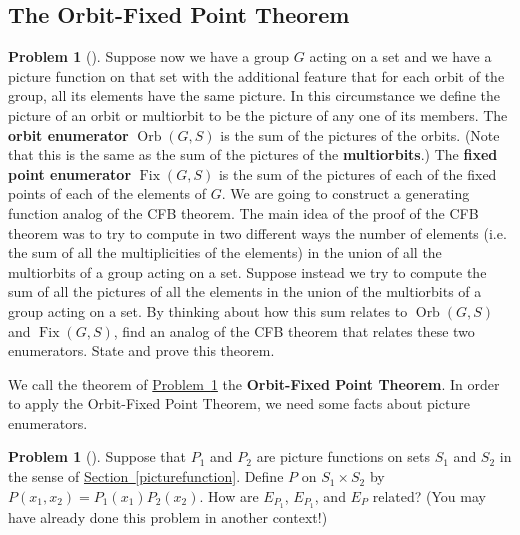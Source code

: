 \documentclass[10pt,]{book}
\newcommand{\terminology}[1]{\textbf{#1}}
\theoremstyle{plain}
\theoremstyle{definition}
\newtheorem{activity}[project]{Problem}
\theoremstyle{definition}
\numberwithin{equation}{chapter}
\DeclareMathOperator{\Fix}{Fix}
\DeclareMathOperator{\Orb}{Orb}
\begin{document}
\subsection[{The Orbit-Fixed Point Theorem}]{The Orbit-Fixed Point Theorem}\label{subsection-68}
\begin{activity}[] \label{orbit-fixed-point-thm}
Suppose now we have a group \(G\) acting on a set and we have a picture function on that set with the additional feature that for each orbit of the group, all its elements have the same picture. In this circumstance we define the picture of an orbit or multiorbit to be the picture of any one of its members. The \terminology{orbit enumerator} \(\Orb(G,S)\) is the sum of the pictures of the orbits. (Note that this is the same as the sum of the pictures of the \terminology{multiorbits}.) The \terminology{fixed point enumerator} \(\Fix(G, S)\) is the sum of the pictures of each of the fixed points of each of the elements of \(G\). We are going to construct a generating function analog of the CFB theorem. The main idea of the proof of the CFB theorem was to try to compute in two different ways the number of elements (i.e. the sum of all the multiplicities of the elements) in the union of all the multiorbits of a group acting on a set. Suppose instead we try to compute the sum of all the pictures of all the elements in the union of the multiorbits of a group acting on a set. By thinking about how this sum relates to \(\Orb(G,S)\) and \(\Fix(G,S)\), find an analog of the CFB theorem that relates these two enumerators. State and prove this theorem. %
\end{activity}
We call the theorem of \hyperref[orbit-fixed-point-thm]{Problem~\ref{orbit-fixed-point-thm}} the \terminology{Orbit-Fixed Point Theorem}. In order to apply the Orbit-Fixed Point Theorem, we need some facts about picture enumerators.%
\begin{activity}[] \label{ProdPrincPictureEnumerators}
Suppose that \(P_1\) and \(P_2\) are picture functions on sets \(S_1\) and \(S_2\) in the sense of \hyperref[picturefunction]{Section~\ref{picturefunction}}. Define \(P\) on \(S_1 \times
S_2\) by \(P(x_1,x_2) = P_1(x_1)P_2(x_2)\). How are \(E_{P_1}\), \(E_{P_1}\), and \(E_{P}\) related? (You may have already done this problem in another context!)%
\end{activity}
\end{document}
